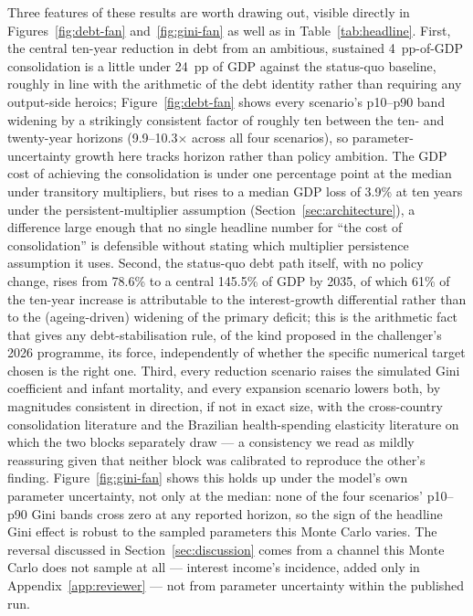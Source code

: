 \documentclass[11pt,a4paper]{article}
\begin{document}
Three features of these results are worth drawing out, visible directly in Figures~\ref{fig:debt-fan} and~\ref{fig:gini-fan} as well as in Table~\ref{tab:headline}. First, the central ten-year reduction in debt from an ambitious, sustained 4~pp-of-GDP consolidation is a little under 24~pp of GDP against the status-quo baseline, roughly in line with the arithmetic of the debt identity rather than requiring any output-side heroics; Figure~\ref{fig:debt-fan} shows every scenario's p10--p90 band widening by a strikingly consistent factor of roughly ten between the ten- and twenty-year horizons (9.9--10.3$\times$ across all four scenarios), so parameter-uncertainty growth here tracks horizon rather than policy ambition. The GDP cost of achieving the consolidation is under one percentage point at the median under transitory multipliers, but rises to a median GDP loss of 3.9\% at ten years under the persistent-multiplier assumption (Section~\ref{sec:architecture}), a difference large enough that no single headline number for ``the cost of consolidation'' is defensible without stating which multiplier persistence assumption it uses. Second, the status-quo debt path itself, with no policy change, rises from 78.6\% to a central 145.5\% of GDP by 2035, of which 61\% of the ten-year increase is attributable to the interest-growth differential rather than to the (ageing-driven) widening of the primary deficit; this is the arithmetic fact that gives any debt-stabilisation rule, of the kind proposed in the challenger's 2026 programme, its force, independently of whether the specific numerical target chosen is the right one. Third, every reduction scenario raises the simulated Gini coefficient and infant mortality, and every expansion scenario lowers both, by magnitudes consistent in direction, if not in exact size, with the cross-country consolidation literature \citep{ballfurcerilleighlloungani2013} and the Brazilian health-spending elasticity literature \citep{szkloclarkerocha2024} on which the two blocks separately draw --- a consistency we read as mildly reassuring given that neither block was calibrated to reproduce the other's finding. Figure~\ref{fig:gini-fan} shows this holds up under the model's own parameter uncertainty, not only at the median: none of the four scenarios' p10--p90 Gini bands cross zero at any reported horizon, so the sign of the headline Gini effect is robust to the sampled parameters this Monte Carlo varies. The reversal discussed in Section~\ref{sec:discussion} comes from a channel this Monte Carlo does not sample at all --- interest income's incidence, added only in Appendix~\ref{app:reviewer} --- not from parameter uncertainty within the published run.
\end{document}
